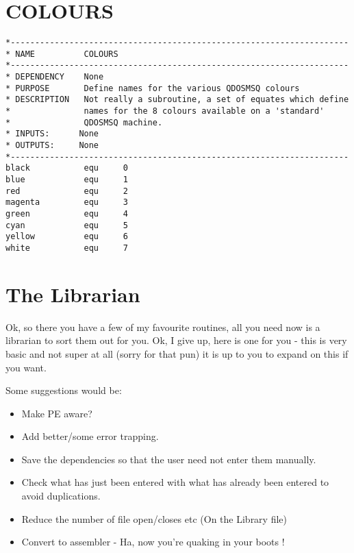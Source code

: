 \section{COLOURS}
\label{ch9-COLOURS}%

\begin{lstlisting}[firstnumber=1,caption={COLOURS}]
*---------------------------------------------------------------------
* NAME          COLOURS
*---------------------------------------------------------------------
* DEPENDENCY    None
* PURPOSE       Define names for the various QDOSMSQ colours
* DESCRIPTION   Not really a subroutine, a set of equates which define
*               names for the 8 colours available on a 'standard'
*               QDOSMSQ machine.
* INPUTS:      None
* OUTPUTS:     None
*---------------------------------------------------------------------
black           equ     0
blue            equ     1
red             equ     2
magenta         equ     3
green           equ     4
cyan            equ     5
yellow          equ     6
white           equ     7
\end{lstlisting}


\section{The Librarian}
\label{ch9-librarian}%

Ok, so there you have a few of my favourite routines, all you need
    now is a librarian to sort them out for you. Ok, I give up, here is one
    for you -{} this is very basic and not super at all (sorry for that pun) it
    is up to you to expand on this if you want.

Some suggestions would be:
\begin{itemize}[itemsep=0pt]

\item{}Make PE aware?


\item{}Add better/some error trapping.


\item{}Save the dependencies so that the user need not enter them
        manually.


\item{}Check what has just been entered with what has already been
        entered to avoid duplications.


\item{}Reduce the number of file open/closes etc (On the Library
        file)


\item{}Convert to assembler -{} Ha, now you're quaking in your boots
       !

\end{itemize}

